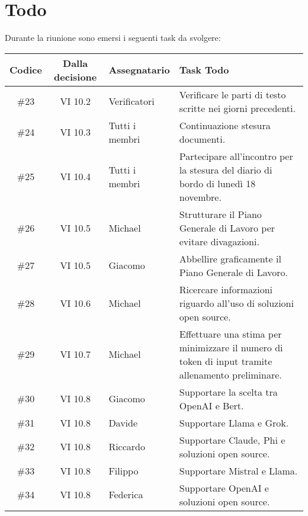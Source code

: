 
\section{Todo}

Durante la riunione sono emersi i seguenti task da svolgere:

\vspace{0.5cm}

\begin{table}[htbp]
\centering
{}
\begin{tabular}{|c|c|p{}|p{}|}
    \hline
    \rowcolor[gray]{0.75}
    \textbf{Codice} & \textbf{Dalla decisione} & \textbf{Assegnatario} & \textbf{Task Todo} \\
    \hline
    \#23 & VI 10.2 & Verificatori & Verificare le parti di testo scritte nei giorni precedenti. \\
    \hline
    \#24 & VI 10.3 & Tutti i membri & Continuazione stesura documenti. \\
    \hline
    \#25 & VI 10.4 & Tutti i membri & Partecipare all'incontro per la stesura del diario di bordo di lunedì 18 novembre. \\
    \hline
    \#26 & VI 10.5 & Michael & Strutturare il Piano Generale di Lavoro per evitare divagazioni. \\
    \hline
    \#27 & VI 10.5 & Giacomo & Abbellire graficamente il Piano Generale di Lavoro. \\
    \hline
    \#28 & VI 10.6 & Michael & Ricercare informazioni riguardo all'uso di soluzioni open source. \\
    \hline
    \#29 & VI 10.7 & Michael & Effettuare una stima per minimizzare il numero di token di input tramite allenamento preliminare. \\
    \hline
    \#30 & VI 10.8 & Giacomo & Supportare la scelta tra OpenAI e Bert. \\
    \hline
    \#31 & VI 10.8 & Davide & Supportare Llama e Grok. \\
    \hline
    \#32 & VI 10.8 & Riccardo & Supportare Claude, Phi e soluzioni open source. \\
    \hline
    \#33 & VI 10.8 & Filippo & Supportare Mistral e Llama. \\
    \hline
    \#34 & VI 10.8 & Federica & Supportare OpenAI e soluzioni open source. \\
    \hline
\end{tabular}
\end{table}